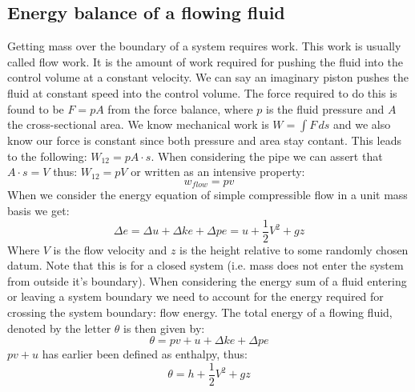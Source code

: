 \documentclass[11pt, a4paper]{article}
\begin{document}
\subsection{Energy balance of a flowing fluid}
Getting mass over the boundary of a system requires work. This work is usually called flow work. It is the amount of work required for pushing the fluid into the control volume at a constant velocity. We can say an imaginary piston pushes the fluid at constant speed into the control volume. The force required to do this is found to be $F = pA$ from the force balance, where $p$ is the fluid pressure and $A$ the cross-sectional area. We know mechanical work is $W = \int F\,ds$ and we also know our force is constant since both pressure and area stay contant. This leads to the following: $W_{12} = pA \cdot s$. When considering the pipe we can assert that $A\cdot s = V$ thus: $W_{12} = pV$ or written as an intensive property:
\begin{equation}
  w_{flow} = pv
\end{equation}
\newline
When we consider the energy equation of simple compressible flow in a unit mass basis we get:
\begin{equation}
  \Delta e = \Delta u + \Delta ke + \Delta pe = u + \frac{1}{2}V^2 + gz
\end{equation}
Where $V$ is the flow velocity and $z$ is the height relative to some randomly chosen datum. Note that this is for a closed system (i.e. mass does not enter the system from outside it's boundary). When considering the energy sum of a fluid entering or leaving a system boundary we need to account for the energy required for crossing the system boundary: flow energy. The total energy of a flowing fluid, denoted by the letter $\theta$ is then given by:
\begin{equation}
  \theta = pv + u + \Delta ke + \Delta pe
\end{equation}
$pv + u$ has earlier been defined as enthalpy, thus:
\begin{equation}
  \theta = h + \frac{1}{2}V^2 + gz
\end{equation}
\end{document}
